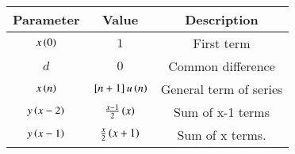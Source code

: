 \begin{tabular}{|c|c|c|}
\hline
Parameter & Value & Description \\
\hline
$x\left(0\right)$ & $1$ & First term\\
\hline
$d$ & $0$ & Common difference\\
\hline
$x\left(n\right)$ & ${}\left[n+1\right]u\left(n\right)$ & General  term of series \\
\hline
$y\left(x-2\right)$ & $\frac{x-1}{2}\left(x\right)$ & Sum of x-1 terms \\
\hline
$y\left(x-1\right)$ & $\frac{x}{2}\left(x+1\right)$ & Sum of x terms. \\
\hline
\end{tabular}
